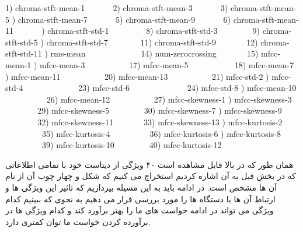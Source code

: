 \documentclass{article}
\begin{document}
\begin{latin}
1) chroma-stft-mean-1 $\;\;\;\;\;\;\;\;\;\;$ 2) chroma-stft-mean-3  $\;\;\;\;\;\;\;\;\;\;$ 3) chroma-stft-mean-5  ) chroma-stft-mean-7 $\;\;\;\;\;\;\;\;\;\;$
5) chroma-stft-mean-9 $\;\;\;\;\;\;\;\;\;\;$ 6) chroma-stft-mean-11 $\;\;\;\;\;\;\;\;\;\;$ ) chroma-stft-std-1 $\;\;\;\;\;\;\;\;\;\;\;\;\;\;$ 8) chroma-stft-std-3 $\;\;\;\;\;\;\;\;\;\;\;\;\;$ 9) chroma-stft-std-5 ) chroma-stft-std-7 $\;\;\;\;\;\;\;\;\;\;\;\;$ 11) chroma-stft-std-9 $\;\;\;\;\;\;\;\;\;\;\;$ 12)  chroma-stft-std-11 ) rms-mean $\;\;\;\;\;\;\;\;\;\;\;\;\;\;\;\;\;\;\;\;\;\;$   14) num-zerocrossing $\;\;\;\;\;\;\;\;\;\;\;$ 15) mfcc-mean-1 ) mfcc-mean-3 $\;\;\;\;\;\;\;\;\;\;\;\;\;\;\;\;\;$ 17) mfcc-mean-5 $\;\;\;\;\;\;\;\;\;\;\;\;\;\;\;\;\;\;$ 18) mfcc-mean-7 ) mfcc-mean-11 $\;\;\;\;\;\;\;\;\;\;\;\;\;\;\;\;\;$ 20) mfcc-mean-13 $\;\;\;\;\;\;\;\;\;\;\;\;\;\;\;\;\;$ 21) mfcc-std-2 ) mfcc-std-4 $\;\;\;\;\;\;\;\;\;\;\;\;\;\;\;\;\;\;\;\;\;\;$ 23) mfcc-std-6 $\;\;\;\;\;\;\;\;\;\;\;\;\;\;\;\;\;\;\;\;\;\;\;$ 24) mfcc-std-8 ) mfcc-mean-10 $\;\;\;\;\;\;\;\;\;\;\;\;\;\;\;\;\;$ 26) mfcc-mean-12 $\;\;\;\;\;\;\;\;\;\;\;\;\;\;\;\;\;$ 27) mfcc-skewness-1 ) mfcc-skewness-3 $\;\;\;\;\;\;\;\;\;\;\;\;\;$ 29) mfcc-skewness-5 $\;\;\;\;\;\;\;\;\;\;\;\;\;$ 30) mfcc-skewness-7 ) mfcc-skewness-9 $\;\;\;\;\;\;\;\;\;\;\;\;\;$ 32) mfcc-skewness-11 $\;\;\;\;\;\;\;\;\;\;\;$ 33) mfcc-skewness-13 ) mfcc-kurtosis-2 $\;\;\;\;\;\;\;\;\;\;\;\;\;\;\;$ 35) mfcc-kurtosis-4 $\;\;\;\;\;\;\;\;\;\;\;\;\;\;\;$ 36) mfcc-kurtosis-6 ) mfcc-kurtosis-8 $\;\;\;\;\;\;\;\;\;\;\;\;\;\;\;$ 39) mfcc-kurtosis-10 $\;\;\;\;\;\;\;\;\;\;\;\;\;$ 40) mfcc-kurtosis-12 \newline
\end{latin} 
همان طور که در بالا قابل مشاهده است ۴۰ ویژگی از دیتاست خود با تمامی اطلاعاتی که در بخش قبل به آن اشاره کردیم استخراج می کنیم که شکل و چهار چوب آن از نام آن ها مشخص است.\newline
در ادامه باید به این مسیله بپردازیم که تاثیر این ویژگی ها و ارتباط آن ها با دستگاه ها را مورد بررسی قرار می دهیم به نحوی که ببینیم کدام ویژگی می تواند در ادامه خواست های ما را بهتر برآورد کند و کدام ویژگی ها در برآورده کردن خواست ما توان کمتری دارد.\newline
\end{document}
